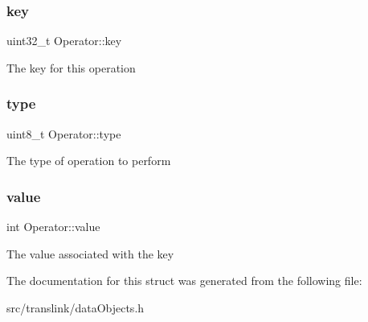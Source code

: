 \subsubsection{\texorpdfstring{key}{key}}
{\footnotesize\ttfamily uint32\+\_\+t Operator\+::key}

The key for this operation \mbox{\label{structOperator_a080f62070dd613b378d51055e10c6666}} 
\subsubsection{\texorpdfstring{type}{type}}
{\footnotesize\ttfamily uint8\+\_\+t Operator\+::type}

The type of operation to perform \mbox{\label{structOperator_a1fc60545d6d6532c156eab3656eb7a32}} 
\subsubsection{\texorpdfstring{value}{value}}
{\footnotesize\ttfamily int Operator\+::value}

The value associated with the key 

The documentation for this struct was generated from the following file\+:\begin{DoxyCompactItemize}
\item 
src/translink/data\+Objects.\+h\end{DoxyCompactItemize}
